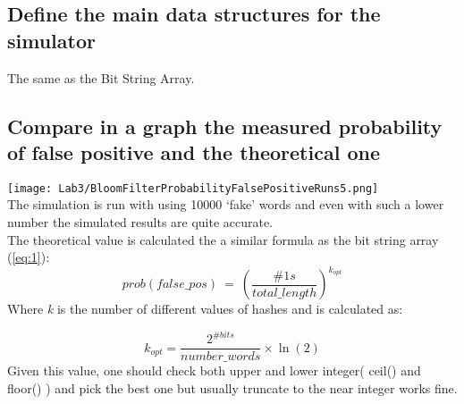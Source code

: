 \documentclass{report}
\begin{document}
{			\subsection{Define the main data structures for the simulator}
						The same as the Bit String Array.
					
			\subsection{Compare in a graph the measured probability of false positive and the theoretical one}
			\texttt{[image: Lab3/BloomFilterProbabilityFalsePositiveRuns5.png]} \\
			The simulation is run with using 10000 `fake' words and even with such a lower number the simulated results are quite accurate. \\
			The theoretical value is calculated the a similar formula as the bit string array (\ref{eq:1}):
			\begin{equation} \label{eq:2}
				prob(false\_pos) \: = \: \left( \frac{\#1s}{total\_length} \right)^{k_{opt}}
			\end{equation}
			Where \emph{k} is the number of different values of hashes and is calculated as: 
			
			\begin{equation} \label{eq:3}
					k_{opt} = \frac {2^{\#bits}}{number\_words} \times \ln(2)
			\end{equation}
			Given this value, one should check both upper and lower integer( ceil() and floor() ) and pick the best one but usually truncate to the near integer works fine.
			
			
			\newpage 
			
}
\end{document}

